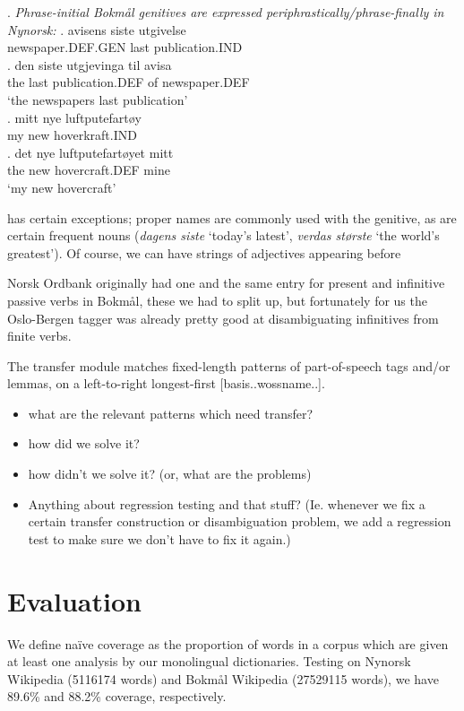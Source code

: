 \documentclass[11pt]{article}
\begin{document}
\ex. \emph{Phrase-initial Bokmål genitives are expressed
  periphrastically/phrase-finally in Nynorsk:}
\ag. avisens siste utgivelse\\
newspaper.DEF.GEN last publication.IND\\
\bg. den siste utgjevinga til avisa\\
the last publication.DEF of newspaper.DEF\\
`the newspapers last publication'\\
\cg. mitt nye luftputefartøy\\
my new hoverkraft.IND\\
\dg. det nye luftputefartøyet mitt\\
the new hovercraft.DEF mine\\
`my new hovercraft'

\Last has certain exceptions; proper names are commonly used with the
genitive, as are certain frequent nouns (\emph{dagens siste} `today's
latest', \emph{verdas største} `the world's
  greatest'). Of course, we can have strings of adjectives appearing before 

Norsk Ordbank originally had one and the same entry for present and
infinitive passive verbs in Bokmål, these we had to split up, but
fortunately for us the Oslo-Bergen tagger was already pretty good at
disambiguating infinitives from finite verbs.

The transfer module matches fixed-length patterns of part-of-speech
tags and/or lemmas, on a left-to-right longest-first
[basis..wossname..]. 

\begin{itemize}
\item what are the relevant patterns which need transfer?
\item how did we solve it?
\item how didn't we solve it? (or, what are the problems)
\item Anything about regression testing and that stuff? (Ie. whenever we
  fix a certain transfer construction or disambiguation problem, we
  add a regression test to make sure we don't have to fix it again.)
\end{itemize}

\section{Evaluation}
 \label{SEC:eval}
We define naïve coverage as the proportion of words in a corpus which
are given at least one analysis by our monolingual
dictionaries. Testing on Nynorsk Wikipedia (5116174 words) and Bokmål
Wikipedia (27529115 words), we have 89.6\% and 88.2\% coverage,
respectively.
\end{document}
